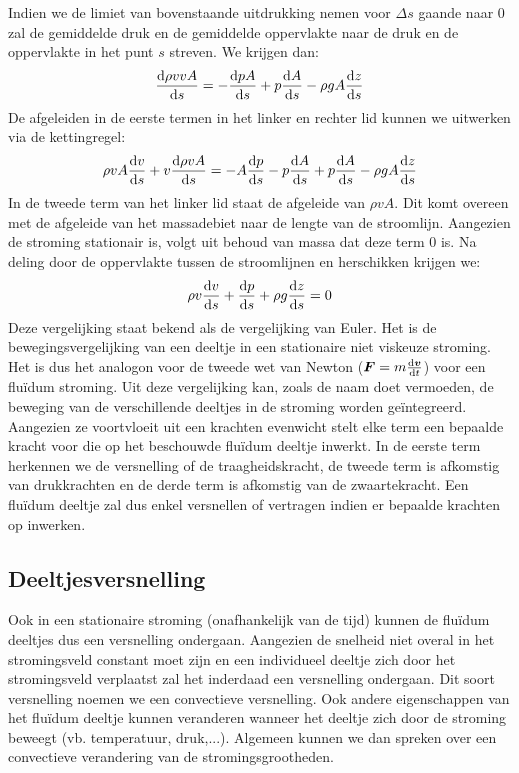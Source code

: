 Indien we de limiet van bovenstaande uitdrukking nemen voor $\Delta s$ gaande naar $0$ zal de gemiddelde druk en de gemiddelde oppervlakte naar de druk en de oppervlakte in het punt $s$ streven. We krijgen dan:
\begin{equation}
	\frac{\mathrm{d} \rho v v A}{\mathrm{d} s} = -\frac{\mathrm{d} p A}{\mathrm{d} s} + p \frac{\mathrm{d} A}{\mathrm{d} s} -\rho g A \frac{\mathrm{d} z}{\mathrm{d} s}
\end{equation}
De afgeleiden in de eerste termen in het linker en rechter lid kunnen we uitwerken via de kettingregel:
\begin{equation}
	\rho v A \frac{\mathrm{d} v}{\mathrm{d} s} +  v \frac{\mathrm{d} \rho v A}{\mathrm{d} s} = -A \frac{\mathrm{d} p}{\mathrm{d} s} - p\frac{\mathrm{d} A}{\mathrm{d} s} + p \frac{\mathrm{d} A}{\mathrm{d} s} -\rho g A \frac{\mathrm{d} z}{\mathrm{d} s}
\end{equation}
In de tweede term van het linker lid staat de afgeleide van $\rho v A$. Dit komt overeen met de afgeleide van het massadebiet naar de lengte van de stroomlijn. Aangezien de stroming stationair is, volgt uit behoud van massa dat deze term $0$ is. Na deling door de oppervlakte tussen de stroomlijnen en herschikken krijgen we:
\begin{equation}
	\rho v \frac{\mathrm{d} v}{\mathrm{d} s} + \frac{\mathrm{d} p}{\mathrm{d} s} + \rho g \frac{\mathrm{d} z}{\mathrm{d} s} = 0
	\label{eqn:vergelijking van Euler}
\end{equation}
Deze vergelijking staat bekend als de vergelijking van Euler. Het is de bewegingsvergelijking van een deeltje in een stationaire niet viskeuze stroming. Het is dus het analogon voor de tweede wet van Newton ($\boldsymbol{F} = m \frac{\mathrm{d} \boldsymbol{v}}{\mathrm{d} t}$) voor een fluïdum stroming. Uit deze vergelijking kan, zoals de naam doet vermoeden, de beweging van de verschillende deeltjes in de stroming worden geïntegreerd. Aangezien ze voortvloeit uit een krachten evenwicht stelt elke term een bepaalde kracht voor die op het beschouwde fluïdum deeltje inwerkt. In de eerste term herkennen we de versnelling of de traagheidskracht, de tweede term is afkomstig van drukkrachten en de derde term is afkomstig van de zwaartekracht. Een fluïdum deeltje zal dus enkel versnellen of vertragen indien er bepaalde krachten op inwerken.

		\subsection{Deeltjesversnelling}
Ook in een stationaire stroming (onafhankelijk van de tijd) kunnen de fluïdum deeltjes dus een versnelling ondergaan. Aangezien de snelheid niet overal in het stromingsveld constant moet zijn en een individueel deeltje zich door het stromingsveld verplaatst zal het inderdaad een versnelling ondergaan. Dit soort versnelling noemen we een convectieve versnelling. Ook andere eigenschappen van het fluïdum deeltje kunnen veranderen wanneer het deeltje zich door de stroming beweegt (vb. temperatuur, druk,...). Algemeen kunnen we dan spreken over een convectieve verandering van de stromingsgrootheden.

